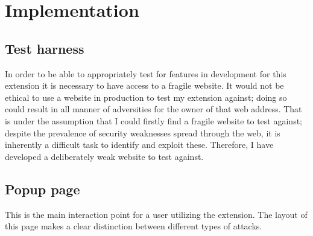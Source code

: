 \chapter{Implementation}


\section{Test harness}

In order to be able to appropriately test for features in development for this extension it is necessary to have access to a fragile website. It would not be ethical to use a website in production to test my extension against; doing so could result in all manner of adversities for the owner of that web address. That is under the assumption that I could firstly find a fragile website to test against; despite the prevalence of security weaknesses spread through the web, it is inherently a difficult task to identify and exploit these. Therefore, I have developed a deliberately weak website to test against. 

\section{Popup page}

This is the main interaction point for a user utilizing the extension. The layout of this page makes a clear distinction between different types of attacks. 